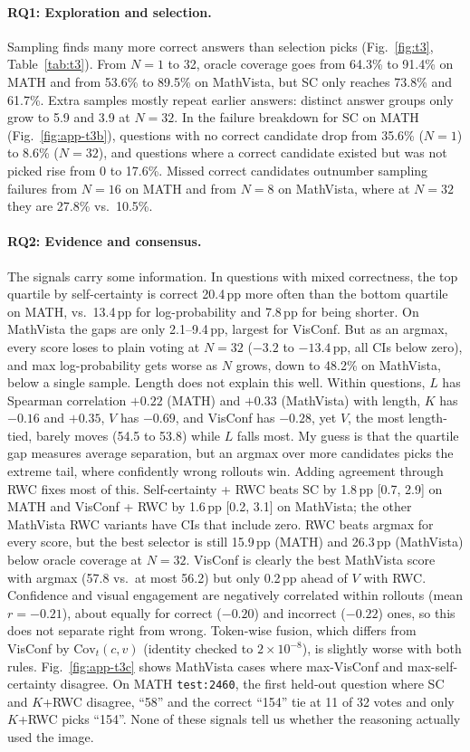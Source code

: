 \documentclass{article}
\newcommand{\pp}{\,pp}
\begin{document}
\paragraph{RQ1: Exploration and selection.} Sampling finds many more correct answers than selection picks (Fig.~\ref{fig:t3}, Table~\ref{tab:t3}). From $N{=}1$ to 32, oracle coverage goes from 64.3\% to 91.4\% on MATH and from 53.6\% to 89.5\% on MathVista, but SC only reaches 73.8\% and 61.7\%. Extra samples mostly repeat earlier answers: distinct answer groups only grow to 5.9 and 3.9 at $N{=}32$. In the failure breakdown for SC on MATH (Fig.~\ref{fig:app-t3b}), questions with no correct candidate drop from 35.6\% ($N{=}1$) to 8.6\% ($N{=}32$), and questions where a correct candidate existed but was not picked rise from 0 to 17.6\%. Missed correct candidates outnumber sampling failures from $N{=}16$ on MATH and from $N{=}8$ on MathVista, where at $N{=}32$ they are 27.8\% vs.\ 10.5\%.

\paragraph{RQ2: Evidence and consensus.} The signals carry some information. In questions with mixed correctness, the top quartile by self-certainty is correct 20.4\pp{} more often than the bottom quartile on MATH, vs.\ 13.4\pp{} for log-probability and 7.8\pp{} for being shorter. On MathVista the gaps are only 2.1--9.4\pp, largest for VisConf. But as an argmax, every score loses to plain voting at $N{=}32$ ($-3.2$ to $-13.4$\pp, all CIs below zero), and max log-probability gets worse as $N$ grows, down to 48.2\% on MathVista, below a single sample. Length does not explain this well. Within questions, $L$ has Spearman correlation $+0.22$ (MATH) and $+0.33$ (MathVista) with length, $K$ has $-0.16$ and $+0.35$, $V$ has $-0.69$, and VisConf has $-0.28$, yet $V$, the most length-tied, barely moves (54.5 to 53.8) while $L$ falls most. My guess is that the quartile gap measures average separation, but an argmax over more candidates picks the extreme tail, where confidently wrong rollouts win. Adding agreement through RWC fixes most of this. Self-certainty + RWC beats SC by 1.8\pp{} [0.7, 2.9] on MATH and VisConf + RWC by 1.6\pp{} [0.2, 3.1] on MathVista; the other MathVista RWC variants have CIs that include zero. RWC beats argmax for every score, but the best selector is still 15.9\pp{} (MATH) and 26.3\pp{} (MathVista) below oracle coverage at $N{=}32$. VisConf is clearly the best MathVista score with argmax (57.8 vs.\ at most 56.2) but only 0.2\pp{} ahead of $V$ with RWC. Confidence and visual engagement are negatively correlated within rollouts (mean $r=-0.21$), about equally for correct ($-0.20$) and incorrect ($-0.22$) ones, so this does not separate right from wrong. Token-wise fusion, which differs from VisConf by $\mathrm{Cov}_t(c,v)$ (identity checked to $2\times10^{-8}$), is slightly worse with both rules. Fig.~\ref{fig:app-t3c} shows MathVista cases where max-VisConf and max-self-certainty disagree. On MATH \texttt{test:2460}, the first held-out question where SC and $K$+RWC disagree, ``58'' and the correct ``154'' tie at 11 of 32 votes and only $K$+RWC picks ``154''. None of these signals tell us whether the reasoning actually used the image.
\end{document}
